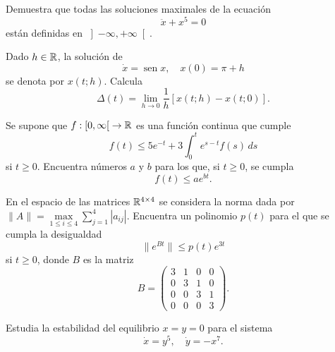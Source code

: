 \documentclass[12pt]{article}
\begin{document}
    \begin{ejercicio}
        Demuestra que todas las soluciones maximales de la ecuación
        \[ \ddot{x} + x^5 = 0 \]
        están definidas en $\left]-\infty, +\infty\right[$.
    \end{ejercicio}

    \begin{ejercicio}
        Dado $h \in \mathbb{R}$, la solución de
        \[ \dot{x} = \operatorname{sen} x, \quad x(0) = \pi + h \]
        se denota por $x(t; h)$. Calcula
        $$\Delta(t) = \lim\limits_{h \to 0} \frac{1}{h} \left[ x(t; h) - x(t; 0) \right].$$
    \end{ejercicio}

    \begin{ejercicio}
        Se supone que $f: \left[0, \infty\right[ \to \mathbb{R}$ es una función continua que cumple
        \[ f(t) \leq 5e^{-t} + 3 \int_{0}^{t} e^{s-t} f(s) \, ds \]
        si $t \geq 0$. Encuentra números $a$ y $b$ para los que, si $t\geq 0$, se cumpla
        \[ f(t) \leq a e^{bt}. \]
    \end{ejercicio}

    \begin{ejercicio}
        En el espacio de las matrices $\mathbb{R}^{4 \times 4}$ se considera la norma dada por $\|A\| = \max\limits_{1 \leq i \leq 4} \sum\limits_{j=1}^{4} |a_{ij}|$. Encuentra un polinomio $p(t)$ para el que se cumpla la desigualdad
        \[ \|e^{Bt}\| \leq p(t) e^{3t} \]
        si $t \geq 0$, donde $B$ es la matriz
        \[ B = \begin{pmatrix} 3 & 1 & 0 & 0 \\ 0 & 3 & 1 & 0 \\ 0 & 0 & 3 & 1 \\ 0 & 0 & 0 & 3 \end{pmatrix}. \]
    \end{ejercicio}

    \begin{ejercicio}
        Estudia la estabilidad del equilibrio $x = y = 0$ para el sistema
        \[ \dot{x} = y^5, \quad \dot{y} = -x^7. \]
    \end{ejercicio}

\end{document}

